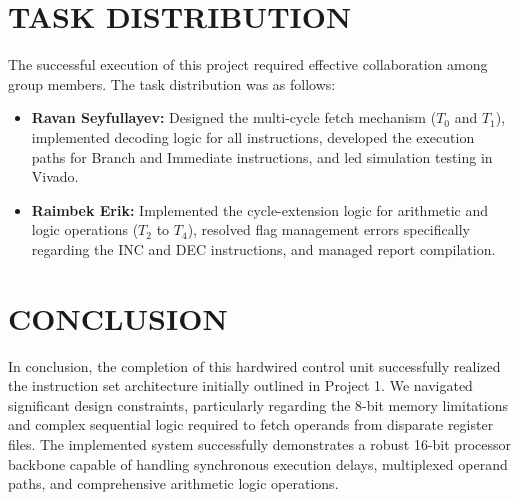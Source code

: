\documentclass[pdftex,12pt,a4paper]{article}
\begin{document}
\section{TASK DISTRIBUTION}
The successful execution of this project required effective collaboration among group members. The task distribution was as follows:
\begin{itemize}
    \item \textbf{Ravan Seyfullayev:} Designed the multi-cycle fetch mechanism ($T_0$ and $T_1$), implemented decoding logic for all instructions, developed the execution paths for Branch and Immediate instructions, and led simulation testing in Vivado.
    \item \textbf{Raimbek Erik:} Implemented the cycle-extension logic for arithmetic and logic operations ($T_2$ to $T_4$), resolved flag management errors specifically regarding the INC and DEC instructions, and managed report compilation.
\end{itemize}

\section{CONCLUSION}
In conclusion, the completion of this hardwired control unit successfully realized the instruction set architecture initially outlined in Project 1. We navigated significant design constraints, particularly regarding the 8-bit memory limitations and complex sequential logic required to fetch operands from disparate register files. The implemented system successfully demonstrates a robust 16-bit processor backbone capable of handling synchronous execution delays, multiplexed operand paths, and comprehensive arithmetic logic operations.
\end{document}

